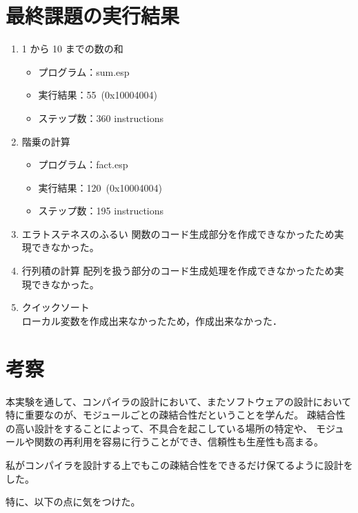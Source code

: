 \documentclass[11pt,a4j]{jarticle}
\begin{document}

\section{最終課題の実行結果} %

\begin{enumerate}
\item {1 から 10 までの数の和 }
  \begin{itemize}
  \item
    プログラム：sum.esp
  \item
    実行結果：55~(0x10004004) %
  \item
    ステップ数：360 instructions %
  \end{itemize}
\item {階乗の計算}
  \begin{itemize}
  \item
    プログラム：fact.esp
  \item
    実行結果：120~(0x10004004) %
  \item
    ステップ数：195 instructions %
  \end{itemize}
\item {エラトステネスのふるい}
  関数のコード生成部分を作成できなかったため実現できなかった。
\item {行列積の計算}
  配列を扱う部分のコード生成処理を作成できなかったため実現できなかった。
\item {クイックソート}\\
  ローカル変数を作成出来なかったため，作成出来なかった．
\end{enumerate}



\section{考察}

本実験を通して、コンパイラの設計において、またソフトウェアの設計において
特に重要なのが、モジュールごとの疎結合性だということを学んだ。
疎結合性の高い設計をすることによって、不具合を起こしている場所の特定や、
モジュールや関数の再利用を容易に行うことができ、信頼性も生産性も高まる。

私がコンパイラを設計する上でもこの疎結合性をできるだけ保てるように設計をした。

特に、以下の点に気をつけた。
\end{document}
